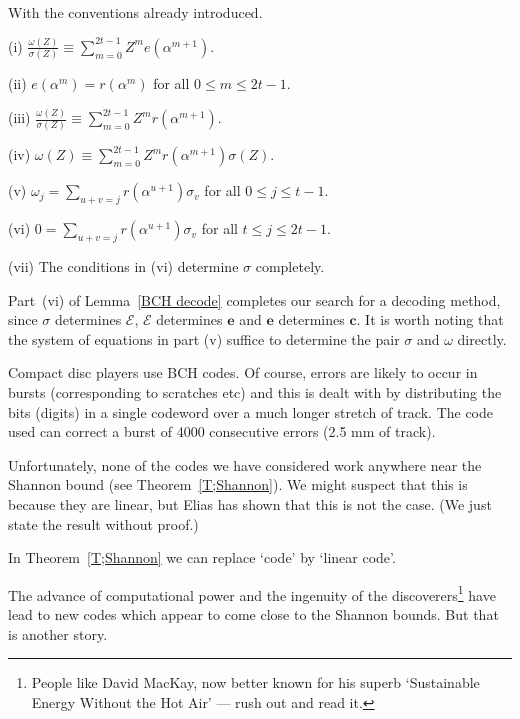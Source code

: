\begin{lemma}\label{BCH decode}
With the conventions already introduced.

(i) ${\displaystyle
\frac{\omega(Z)}{\sigma(Z)}\equiv
\sum_{m=0}^{2t-1}Z^{m}e(\alpha^{m+1})}$.

(ii) $e(\alpha^{m})=r(\alpha^{m})$ for all $0\leq m\leq 2t-1$.

(iii) ${\displaystyle
\frac{\omega(Z)}{\sigma(Z)}\equiv
\sum_{m=0}^{2t-1}Z^{m}r(\alpha^{m+1})}$.

(iv) $\omega(Z)\equiv\sum_{m=0}^{2t-1}Z^{m}r(\alpha^{m+1})
\sigma(Z).$

(v) ${\displaystyle 
\omega_{j}=\sum_{u+v=j}r(\alpha^{u+1})\sigma_{v}}$ for all
$0\leq j\leq t-1$.

(vi) ${\displaystyle 
0=\sum_{u+v=j}r(\alpha^{u+1})\sigma_{v}}$ for all $t\leq j\leq 2t-1$.

(vii) The conditions in (vi) determine $\sigma$ completely.
\end{lemma}
\noindent
Part~(vi) of Lemma~\ref{BCH decode} completes our search
for a decoding method, since $\sigma$ determines ${\mathcal E}$,
${\mathcal E}$ determines ${\mathbf e}$ and ${\mathbf e}$
determines ${\mathbf c}$. It is worth noting that
the system of equations in part (v) suffice to determine
the pair $\sigma$ and $\omega$ directly.

Compact disc players use BCH codes. Of course,  errors
are likely to occur in bursts (corresponding to
scratches etc) and this is dealt with by
distributing the bits (digits) in a single codeword
over a much longer stretch of track. The code used
can correct a burst of 4000 consecutive errors
(2.5 mm of track).


Unfortunately, none of the codes we have considered
work anywhere near the Shannon bound
(see Theorem~\ref{T;Shannon}). We might suspect
that this is because they are linear,
but Elias has shown that this is not the case.
(We just state the result without proof.)
\begin{theorem}
In  Theorem~\ref{T;Shannon}  we can replace `code'
by `linear code'.
\end{theorem}
\noindent

The advance of computational power and the 
ingenuity of the discoverers\footnote{People
like David MacKay, now better known for his
superb `Sustainable Energy Without the Hot Air'
--- rush out and read it.} have lead to
new codes which appear to come close to
the Shannon bounds. But that is another story.  

